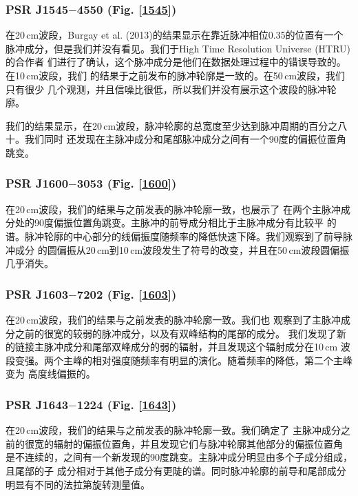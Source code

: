 \subsubsection{PSR J1545$-$4550 (Fig. \ref{1545})}

在20\,cm波段，Burgay et al. (2013)\supercite{Burgay13}的结果显示在靠近脉冲相位0.35的位置有一个
脉冲成分，但是我们并没有看见。我们于High Time Resolution Universe (HTRU)的合作者
们进行了确认，这个脉冲成分是他们在数据处理过程中的错误导致的。在10\,cm波段，我们
的结果于之前发布的脉冲轮廓是一致的\supercite{Burgay13}。在50\,cm波段，我们只有很少
几个观测，并且信噪比很低，所以我们并没有展示这个波段的脉冲轮廓。

我们的结果显示，在20\,cm波段，脉冲轮廓的总宽度至少达到脉冲周期的百分之八十。我们同时
还发现在主脉冲成分和尾部脉冲成分之间有一个90度的偏振位置角跳变。

\subsubsection{PSR J1600$-$3053 (Fig. \ref{1600})}

在20\,cm波段，我们的结果与之前发表的脉冲轮廓一致\supercite{Ord04,Yan11a}，也展示了
在两个主脉冲成分处的90度偏振位置角跳变。主脉冲的前导成分相比于主脉冲成分有比较平
的谱。脉冲轮廓的中心部分的线偏振度随频率的降低快速下降。我们观察到了前导脉冲成分
的圆偏振从20\,cm到10\,cm波段发生了符号的改变，并且在50\,cm波段圆偏振几乎消失。

\subsubsection{PSR J1603$-$7202 (Fig. \ref{1603})}

在20\,cm波段，我们的结果与之前发表的脉冲轮廓一致\supercite{Ord04,Yan11a}。我们也
观察到了主脉冲成分之前的很宽的较弱的脉冲成分，以及有双峰结构的尾部的成分。
我们发现了新的链接主脉冲成分和尾部双峰成分的弱的辐射，并且发现这个辐射成分在10\,cm
波段变强。两个主峰的相对强度随频率有明显的演化。随着频率的降低，第二个主峰变为
高度线偏振的。

\subsubsection{PSR J1643$-$1224 (Fig. \ref{1643})}

在20\,cm波段，我们的结果与之前发表的脉冲轮廓一致\supercite{Ord04,Yan11a}。我们确定了
主脉冲成分之前的很宽的辐射的偏振位置角，并且发现它们与脉冲轮廓其他部分的偏振位置角
是不连续的，之间有一个新发现的90度跳变。主脉冲成分明显由多个子成分组成，且尾部的子
成分相对于其他子成分有更陡的谱。同时脉冲轮廓的前导和尾部成分明显有不同的法拉第旋转测量值。


